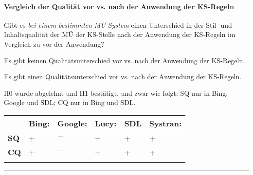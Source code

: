 \paragraph*{Vergleich der Qualität vor vs. nach der Anwendung der KS-Regeln}
\begin{description}[font=\normalfont\bfseries]
\item [Fragestellung:] Gibt es \textit{bei einem bestimmten MÜ-System} einen Unterschied in der Stil- und Inhaltsqualität der MÜ der KS-Stelle nach der Anwendung der KS-Regeln im Vergleich zu vor der Anwendung?
\item [H0 --] Es gibt keinen Qualitätsunterschied vor vs. nach der Anwendung der KS-Regeln.
\item [H1 --] Es gibt einen Qualitätsunterschied vor vs. nach der Anwendung der KS-Regeln.
\item [Resultat:] H0 wurde abgelehnt und H1 bestätigt, und zwar wie folgt: SQ nur in Bing, Google und SDL; CQ nur in Bing und SDL.
\end{description}
\begin{tabularx}{\textwidth}{lXXXXX}
\lsptoprule
& \textbf{Bing:} & \textbf{Google:} & \textbf{Lucy:} & \textbf{SDL} & \textbf{Systran:}\\
\midrule
\textbf{SQ} & \cellcolor{smGreen} + & \cellcolor{smGreen} $-$ & + & \cellcolor{smGreen} + & + \\
\textbf{CQ} & \cellcolor{smGreen} + & $-$ & + & \cellcolor{smGreen} + & + \\
\lspbottomrule
\end{tabularx}

\hrule
